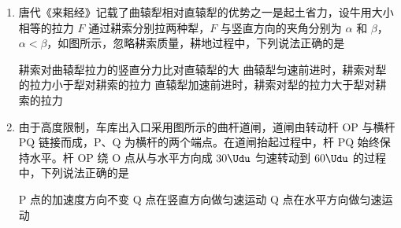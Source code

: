 \documentclass[\gkver]{gaokaozhenti}
\begin{document}
\begin{enumerate}
{	故选 D。
}

\item
唐代《来耜经》记载了曲辕犁相对直辕犁的优势之一是起土省力，设牛用大小相等的拉力 $F$ 通过耕索分别拉两种犁，$F$ 与竖直方向的夹角分别为 $\alpha$ 和 $\beta$，$\alpha<\beta$，如图所示，忽略耕索质量，耕地过程中，下列说法正确的是 


{耕索对曲辕犁拉力的竖直分力比对直辕犁的大}
{曲辕犁匀速前进时，耕索对犁的拉力小于犁对耕索的拉力}
{直辕犁加速前进时，耕索对犁的拉力大于犁对耕索的拉力}


\item
由于高度限制，车库出入口采用图所示的曲杆道闸，道闸由转动杆 OP 与横杆 PQ 链接而成，P、Q 为横杆的两个端点。在道闸抬起过程中，杆 PQ 始终保持水平。杆 OP 绕 O 点从与水平方向成 $30\Udu$ 匀速转动到 $60\Udu$ 的过程中，下列说法正确的是 


{P 点的加速度方向不变}
{Q 点在竖直方向做匀速运动}
{Q 点在水平方向做匀速运动}

\end{enumerate}
\end{document}
